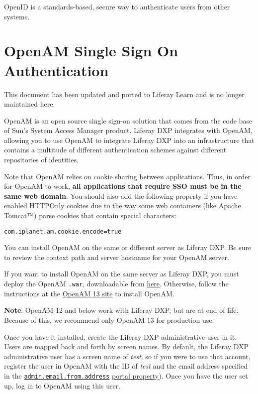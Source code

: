 OpenID is a standards-based, secure way to authenticate users from other
systems.

\chapter{OpenAM Single Sign On
Authentication}\label{openam-single-sign-on-authentication}

{This document has been updated and ported to Liferay Learn and is no
longer maintained here.}

OpenAM is an open source single sign-on solution that comes from the
code base of Sun's System Access Manager product. Liferay DXP integrates
with OpenAM, allowing you to use OpenAM to integrate Liferay DXP into an
infrastructure that contains a multitude of different authentication
schemes against different repositories of identities.

Note that OpenAM relies on cookie sharing between applications. Thus, in
order for OpenAM to work, \textbf{all applications that require SSO must
be in the same web domain}. You should also add the following property
if you have enabled HTTPOnly cookies due to the way some web containers
(like Apache Tomcat™) parse cookies that contain special characters:

\begin{verbatim}
com.iplanet.am.cookie.encode=true
\end{verbatim}

You can install OpenAM on the same or different server as Liferay DXP.
Be sure to review the context path and server hostname for your OpenAM
server.

If you want to install OpenAM on the same server as Liferay DXP, you
must deploy the OpenAM \texttt{.war}, downloadable from
\href{https://backstage.forgerock.com/downloads/browse/am/archive/productId:openam}{here}.
Otherwise, follow the instructions at the
\href{https://backstage.forgerock.com/docs/openam/13/install-guide/}{OpenAM
13 site} to install OpenAM.

\noindent\hrulefill

\textbf{Note}: OpenAM 12 and below work with Liferay DXP, but are at end
of life. Because of this, we recommend only OpenAM 13 for production
use.

\noindent\hrulefill

Once you have it installed, create the Liferay DXP administrative user
in it. Users are mapped back and forth by screen names. By default, the
Liferay DXP administrative user has a screen name of \emph{test}, so if
you were to use that account, register the user in OpenAM with the ID of
\emph{test} and the email address specified in the
\href{@platform-ref@/7.2-latest/propertiesdoc/portal.properties.html\#Admin\%20Portlet}{\texttt{admin.email.from.address}}
\href{/docs/7-2/deploy/-/knowledge_base/d/portal-properties}{portal
property}). Once you have the user set up, log in to OpenAM using this
user.

